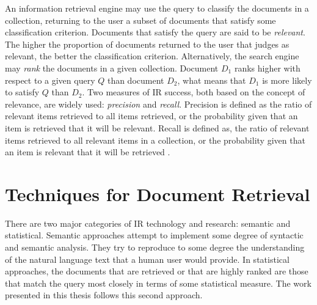 An information retrieval engine may use the query to classify the documents in a collection, returning to the user a subset of documents that satisfy some classification criterion. Documents that satisfy the query are said to be \textit{relevant}. The higher the proportion of documents returned to the user that judges as relevant, the better the classification criterion. Alternatively, the search engine may \textit{rank} the documents in a given collection. Document $D_1$ ranks higher with respect to a given query $Q$ than document $D_2$, what means that $D_1$ is more likely to satisfy $Q$ than $D_2$. Two measures of IR success, both based on the concept of relevance, are widely used: \textit{precision} and \textit{recall}. Precision is defined as the ratio of relevant items retrieved to all items retrieved, or the probability given that an item is retrieved that it will be relevant. Recall is defined as, the ratio of relevant items retrieved to all relevant items in a collection, or the probability given that an item is relevant that it will be retrieved \citep{saracevic1995}.

\section{Techniques for Document Retrieval}\label{sec:related-work}

There are two major categories of IR technology and research: semantic and statistical. Semantic approaches attempt to implement some degree of syntactic and semantic analysis. They try to reproduce to some degree the understanding of the natural language text that a human user would provide. In statistical approaches, the documents that are retrieved or that are highly ranked are those that match the query most closely in terms of some statistical measure. The work presented in this thesis follows this second approach. 

